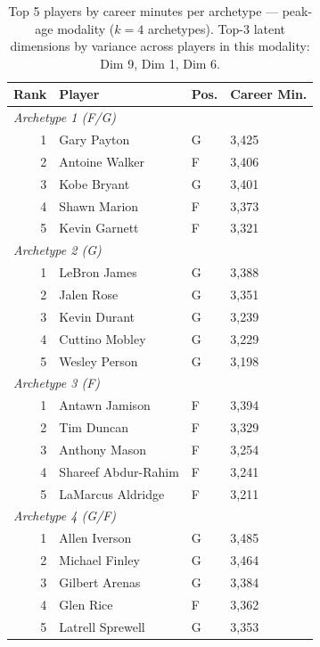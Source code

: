 \begin{table}[htbp]
  \centering\small
  \begin{tabular}{rlll}
    \toprule
    Rank & Player & Pos. & Career Min. \\
    \midrule
    \multicolumn{4}{l}{\textit{Archetype 1 (F/G)}} \\
    \midrule
    1 & Gary Payton & G & 3,425 \\
    2 & Antoine Walker & F & 3,406 \\
    3 & Kobe Bryant & G & 3,401 \\
    4 & Shawn Marion & F & 3,373 \\
    5 & Kevin Garnett & F & 3,321 \\
    \midrule[0.4pt]
    \multicolumn{4}{l}{\textit{Archetype 2 (G)}} \\
    \midrule
    1 & LeBron James & G & 3,388 \\
    2 & Jalen Rose & G & 3,351 \\
    3 & Kevin Durant & G & 3,239 \\
    4 & Cuttino Mobley & G & 3,229 \\
    5 & Wesley Person & G & 3,198 \\
    \midrule[0.4pt]
    \multicolumn{4}{l}{\textit{Archetype 3 (F)}} \\
    \midrule
    1 & Antawn Jamison & F & 3,394 \\
    2 & Tim Duncan & F & 3,329 \\
    3 & Anthony Mason & F & 3,254 \\
    4 & Shareef Abdur-Rahim & F & 3,241 \\
    5 & LaMarcus Aldridge & F & 3,211 \\
    \midrule[0.4pt]
    \multicolumn{4}{l}{\textit{Archetype 4 (G/F)}} \\
    \midrule
    1 & Allen Iverson & G & 3,485 \\
    2 & Michael Finley & G & 3,464 \\
    3 & Gilbert Arenas & G & 3,384 \\
    4 & Glen Rice & F & 3,362 \\
    5 & Latrell Sprewell & G & 3,353 \\
    \bottomrule
  \end{tabular}
  \caption{Top 5 players by career minutes per archetype --- peak-age modality ($k=4$ archetypes). Top-3 latent dimensions by variance across players in this modality: Dim 9, Dim 1, Dim 6.}
  \label{tab:arch_reps_peak_age}
\end{table}

